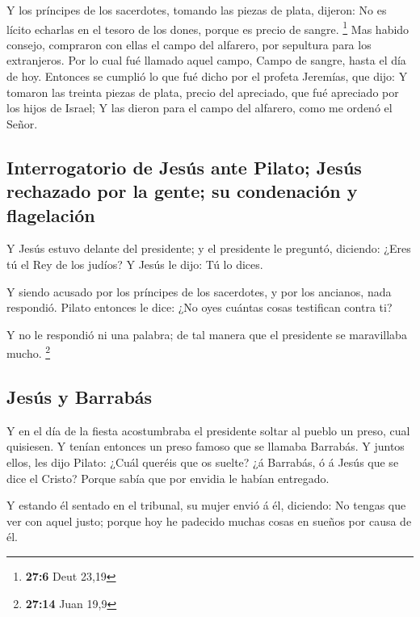  Y los príncipes de los sacerdotes, tomando las piezas de
plata, dijeron: No es lícito echarlas en el tesoro de los dones, porque
es precio de sangre. \footnote{\textbf{27:6} Deut 23,19} 
Mas habido consejo, compraron con ellas el campo del alfarero, por
sepultura para los extranjeros.  Por lo cual fué llamado
aquel campo, Campo de sangre, hasta el día de hoy.  Entonces
se cumplió lo que fué dicho por el profeta Jeremías, que dijo: Y tomaron
las treinta piezas de plata, precio del apreciado, que fué apreciado por
los hijos de Israel;  Y las dieron para el campo del
alfarero, como me ordenó el Señor.

\hypertarget{interrogatorio-de-jesuxfas-ante-pilato-jesuxfas-rechazado-por-la-gente-su-condenaciuxf3n-y-flagelaciuxf3n}{%
\subsection{Interrogatorio de Jesús ante Pilato; Jesús rechazado por la
gente; su condenación y
flagelación}\label{interrogatorio-de-jesuxfas-ante-pilato-jesuxfas-rechazado-por-la-gente-su-condenaciuxf3n-y-flagelaciuxf3n}}

 Y Jesús estuvo delante del presidente; y el presidente le
preguntó, diciendo: ¿Eres tú el Rey de los judíos? Y Jesús le dijo: Tú
lo dices.

 Y siendo acusado por los príncipes de los sacerdotes, y
por los ancianos, nada respondió.  Pilato entonces le dice:
¿No oyes cuántas cosas testifican contra ti?

 Y no le respondió ni una palabra; de tal manera que el
presidente se maravillaba mucho. \footnote{\textbf{27:14} Juan 19,9}

\hypertarget{jesuxfas-y-barrabuxe1s}{%
\subsection{Jesús y Barrabás}\label{jesuxfas-y-barrabuxe1s}}

 Y en el día de la fiesta acostumbraba el presidente soltar
al pueblo un preso, cual quisiesen.  Y tenían entonces un
preso famoso que se llamaba Barrabás.  Y juntos ellos, les
dijo Pilato: ¿Cuál queréis que os suelte? ¿á Barrabás, ó á Jesús que se
dice el Cristo?  Porque sabía que por envidia le habían
entregado.

 Y estando él sentado en el tribunal, su mujer envió á él,
diciendo: No tengas que ver con aquel justo; porque hoy he padecido
muchas cosas en sueños por causa de él.

